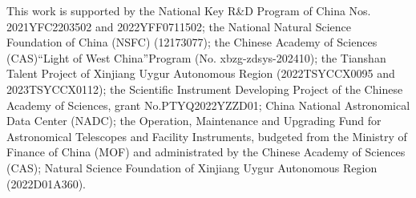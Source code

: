 \documentclass[referee]{raa}
\begin{document}
\normalem
\begin{acknowledgements}

This work is supported by the National Key R\&D Program of China Nos. 2021YFC2203502 and 2022YFF0711502; the National Natural Science Foundation of China (NSFC) (12173077); the Chinese Academy of Sciences (CAS)“Light of West China”Program (No. xbzg-zdsys-202410); the Tianshan Talent Project of Xinjiang Uygur Autonomous Region (2022TSYCCX0095 and 2023TSYCCX0112); the Scientific Instrument Developing Project of the Chinese Academy of Sciences, grant No.PTYQ2022YZZD01; China National Astronomical Data Center (NADC); the Operation, Maintenance and Upgrading Fund for Astronomical Telescopes and Facility Instruments, budgeted from the Ministry of Finance of China (MOF) and administrated by the Chinese Academy of Sciences (CAS); Natural Science Foundation of Xinjiang Uygur Autonomous Region (2022D01A360).

\end{acknowledgements}
  


\end{document}
